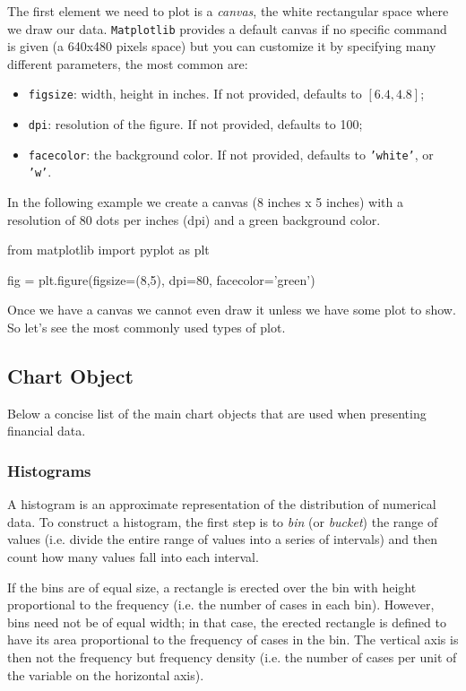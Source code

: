 The first element we need to plot is a \emph{canvas}, the white rectangular space where we draw our data. \texttt{Matplotlib} provides a default canvas if no specific command is given (a 640x480 pixels space) but you can customize it by specifying many different parameters, the most common are:

\begin{itemize}
\tightlist
\item \texttt{figsize}: width, height in inches. If not provided, defaults to \([6.4, 4.8]\);
\item \texttt{dpi}: resolution of the figure. If not provided, defaults to 100;
\item \texttt{facecolor}: the background color. If not provided, defaults to \texttt{'white'}, or \texttt{'w'}.
\end{itemize}

In the following example we create a canvas (8 inches x 5 inches) with a resolution of 80 dots per inches (dpi) and a green background color.

\begin{ipython}
from matplotlib import pyplot as plt

fig = plt.figure(figsize=(8,5), dpi=80, facecolor='green')
\end{ipython}

Once we have a canvas we cannot even draw it unless we have some plot to show. So let's see the most commonly used types of plot.

\subsection{Chart Object}\label{chart-object}

Below a concise list of the main chart objects that are used when presenting financial data.

\subsubsection{Histograms}\label{histograms}

A histogram is an approximate representation of the distribution of numerical data. To construct a histogram, the first step is to \emph{bin} (or \emph{bucket}) the range of values (i.e. divide the entire range of values into a series of intervals) and then count how many values fall into each interval.

If the bins are of equal size, a rectangle is erected over the bin with height proportional to the frequency (i.e. the number of cases in each bin).
However, bins need not be of equal width; in that case, the erected rectangle is defined to have its area proportional to the frequency of cases in the bin. 
The vertical axis is then not the frequency but frequency density (i.e. the number of cases per unit of the variable on the horizontal axis).

